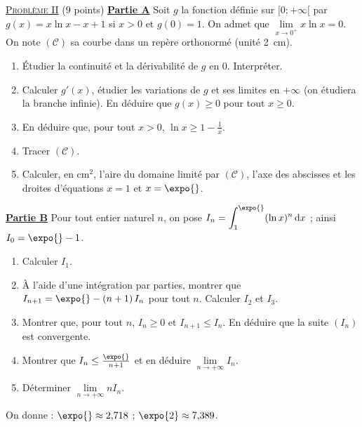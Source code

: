 \noindent \underline{\textsc{Probl\`eme II}} (9 points) \newline
\underline{\textbf{Partie A}} \newline
Soit $g$ la fonction d\'efinie sur $[0 ; +\infty[$ par $g(x) = x\ln x - x + 1$ si $x > 0$ et $g(0) = 1$. On admet que
$\lim\limits_{x \to 0^+} x\ln x = 0$. On note $(\mathscr{C})$ sa courbe dans un rep\`ere orthonorm\'e (unit\'e 2~cm).
\begin{enumerate}
      \item \'Etudier la continuit\'e et la d\'erivabilit\'e de $g$ en $0$. Interpr\'eter.
      \item Calculer $g'(x)$, \'etudier les variations de $g$ et ses limites en $+\infty$ (on \'etudiera la branche infinie).
            En d\'eduire que $g(x) \geq 0$ pour tout $x \geq 0$.
      \item En d\'eduire que, pour tout $x > 0$, $\ln x \geq 1 - \frac{1}{x}$.
      \item Tracer $(\mathscr{C})$.
      \item Calculer, en cm$^2$, l'aire du domaine limit\'e par $(\mathscr{C})$, l'axe des abscisses et les droites
            d'\'equations $x = 1$ et $x = \expo{}$.
\end{enumerate}
\underline{\textbf{Partie B}} \newline
Pour tout entier naturel $n$, on pose $I_n = \displaystyle\int_1^{\expo{}} (\ln x)^n\,\mathrm{d}x$ ; ainsi $I_0 = \expo{} - 1$.
\begin{enumerate}
      \item Calculer $I_1$.
      \item \`A l'aide d'une int\'egration par parties, montrer que $I_{n+1} = \expo{} - (n+1)\,I_n$ pour tout $n$. Calculer $I_2$ et $I_3$.
      \item Montrer que, pour tout $n$, $I_n \geq 0$ et $I_{n+1} \leq I_n$. En d\'eduire que la suite $(I_n)$ est convergente.
      \item Montrer que $I_n \leq \frac{\expo{}}{n+1}$ et en d\'eduire $\lim\limits_{n \to +\infty} I_n$.
      \item D\'eterminer $\lim\limits_{n \to +\infty} n I_n$.
\end{enumerate}
\begin{center}
On donne : $\expo{} \approx 2{,}718$ ; $\expo{2} \approx 7{,}389$.
\end{center}

\newpage
